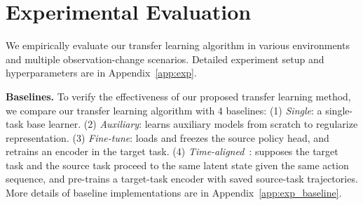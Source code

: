\vspace{-0.5em}
\section{Experimental Evaluation}
\label{sec:exp}


We empirically evaluate our transfer learning algorithm in various environments and multiple observation-change scenarios.
Detailed experiment setup and hyperparameters are in Appendix~\ref{app:exp}.

\textbf{Baselines.}
To verify the effectiveness of our proposed transfer learning method, we compare our transfer learning algorithm with 4 baselines: 
(1) \textit{Single}: a single-task base learner. 
(2) \textit{Auxiliary}: learns auxiliary models from scratch to regularize representation. 
(3) \textit{Fine-tune}: loads and freezes the source policy head, and retrains an encoder in the target task. 
(4) \textit{Time-aligned}~\citep{gupta2017learning}: supposes the target task and the source task proceed to the same latent state given the same action sequence, and pre-trains a target-task encoder with saved source-task trajectories. More details of baseline implementations are in Appendix~\ref{app:exp_baseline}.

